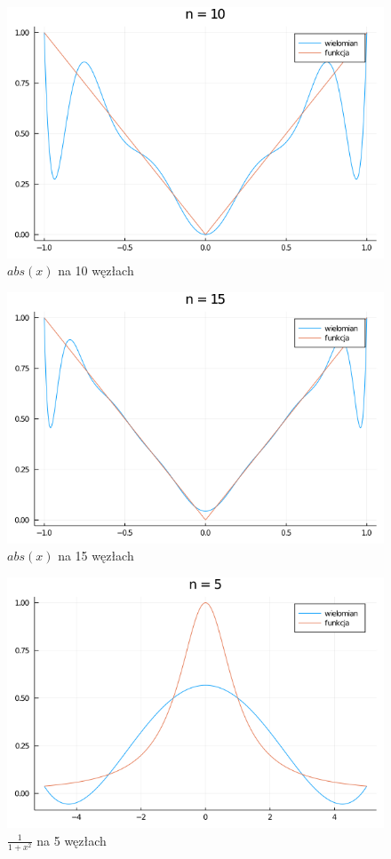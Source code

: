 \documentclass[12pt]{article}
\begin{document}
\begin{figure}[h!]
    \caption{$abs(x)$ na 10 węzłach}
    \centering
    \includegraphics[scale=0.5]{popz6f_10.png}
\end{figure}
\begin{figure}[h!]
    \caption{$abs(x)$ na 15 węzłach}
    \centering
    \includegraphics[scale=0.5]{z6f_15.png}
\end{figure}

\begin{figure}[h!]
    \caption{$\frac{1}{1+x^2}$ na 5 węzłach}
    \centering
    \includegraphics[scale=0.5]{z6g_5.png}
\end{figure}
\end{document}
